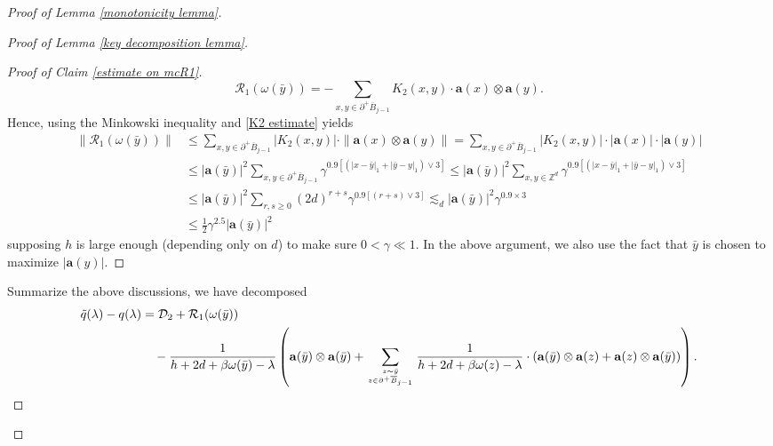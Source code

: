 \documentclass[11pt,reqno,UTF8,twoside]{amsart}
\newcommand{\Z}{\mathbb{Z}}
\newcommand{\tq}{\tilde{q}}
\newcommand{\bfa}{\mathbf{a}}
\newcommand{\mcD}{\mathcal{D}}
\newcommand{\mcR}{\mathcal{R}}
\newcommand{\barB}{\overline{B}}
\theoremstyle{definition}
\numberwithin{equation}{section}
\begin{document}
\begin{proof}[Proof of Lemma \ref{monotonicity lemma}]
\begin{proof}[Proof of Lemma \ref{key decomposition lemma}]
\begin{proof}[Proof of Claim \ref{estimate on mcR1}]
  \[\mcR_1(\omega(\bar{y}))=-\sum_{x,y\in \partial^+ \barB_{j-1}}K_2(x,y)\cdot \bfa(x)\otimes \bfa(y).\]
  Hence, using the Minkowski inequality and \eqref{K2 estimate} yields
  \begin{align*}
    \| \mcR_{1}(\omega(\bar{y})) \| & \leq \sum_{x,y\in \partial^+ \barB_{j-1}} |K_2(x,y)|\cdot \| \bfa(x)\otimes \bfa(y) \| = \sum_{x,y\in \partial^+ \barB_{j-1}} |K_2(x,y)|\cdot | \bfa(x)|\cdot |\bfa(y) | \\
          &\leq |\bfa(\bar{y})|^2 \sum_{x,y\in \partial^+ \barB_{j-1}} \gamma^{0.9[(|x-\bar{y}|_1+|\bar{y}-y|_1)\vee 3]} \leq |\bfa(\bar{y})|^2 \sum_{x,y\in \Z^d } \gamma^{0.9[(|x-\bar{y}|_1+|\bar{y}-y|_1)\vee 3]} \\
          &\leq |\bfa(\bar{y})|^2 \sum_{r,s\geq 0} (2d)^{r+s}\gamma^{0.9[(r+s)\vee 3]} \lesssim_d |\bfa(\bar{y})|^2 \gamma^{0.9\times 3} \\
          &\leq \frac{1}{2}\gamma^{2.5} |\bfa(\bar{y})|^2 
  \end{align*}
  supposing $h$ is large enough (depending only on $d$) to make sure  $0<\gamma\ll1$.  In the above argument, we also use the fact that $\bar{y}$ is chosen to maximize $|\bfa(y)|$.

\end{proof}
Summarize the above discussions, we have decomposed
{\small
\begin{align}\label{further baby decomposition 1}
  \tq(\lambda)-q(\lambda)&= \mcD_2 +\mcR_1 (\omega(\bar{y}))\\
  \notag &\ \ \ -\frac{1}{h+2d+\beta \omega(\bar{y})-\lambda}\left(\bfa(\bar{y})\otimes \bfa(\bar{y})+ \sum_{z\sim \bar{y} \atop z\in \partial^+\barB_{j-1}} \frac{1}{h+2d+\beta\omega(z)-\lambda } \cdot(\bfa(\bar{y}) \otimes  \bfa(z)+\bfa(z)\otimes\bfa(\bar{y})  )\right).
\end{align}
}


\end{proof}
\end{proof}
\end{document}
